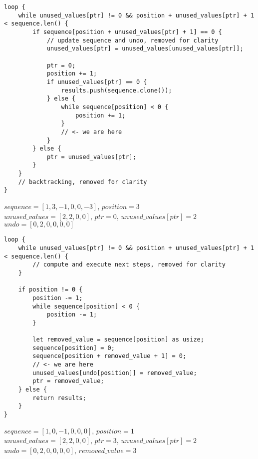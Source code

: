 \begin{frame}[fragile]
    \begin{verbatim}
loop {
    while unused_values[ptr] != 0 && position + unused_values[ptr] + 1 < sequence.len() {
        if sequence[position + unused_values[ptr] + 1] == 0 {
            // update sequence and undo, removed for clarity
            unused_values[ptr] = unused_values[unused_values[ptr]];
            
            ptr = 0;
            position += 1;
            if unused_values[ptr] == 0 {
                results.push(sequence.clone());
            } else {
                while sequence[position] < 0 {
                    position += 1;
                }
                // <- we are here
            }
        } else {
            ptr = unused_values[ptr];
        }
    }
    // backtracking, removed for clarity
}
    \end{verbatim}
    $sequence = [1, 3, -1, 0, 0, -3]$, $position = 3$\\
    $unused\_values = [2, 2, 0, 0]$, $ptr = 0$, $unused\_values[ptr] = 2$\\
    $undo = [0, 2, 0, 0, 0, 0]$
\end{frame}
\begin{frame}[fragile]
    \begin{verbatim}
loop {
    while unused_values[ptr] != 0 && position + unused_values[ptr] + 1 < sequence.len() {
        // compute and execute next steps, removed for clarity
    }
    
    if position != 0 {
        position -= 1;
        while sequence[position] < 0 {
            position -= 1;
        }
        
        let removed_value = sequence[position] as usize;
        sequence[position] = 0;
        sequence[position + removed_value + 1] = 0;
        // <- we are here
        unused_values[undo[position]] = removed_value;
        ptr = removed_value;
    } else {
        return results;
    }
}
    \end{verbatim}
    $sequence = [1, 0, -1, 0, 0, 0]$, $position = 1$\\
    $unused\_values = [2, 2, 0, 0]$, $ptr = 3$, $unused\_values[ptr] = 2$\\
    $undo = [0, 2, 0, 0, 0, 0]$, $removed\_value = 3$
\end{frame}
